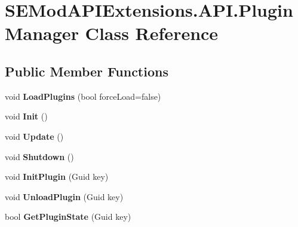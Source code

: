 \hypertarget{class_s_e_mod_a_p_i_extensions_1_1_a_p_i_1_1_plugin_manager}{}\section{S\+E\+Mod\+A\+P\+I\+Extensions.\+A\+P\+I.\+Plugin\+Manager Class Reference}
\label{class_s_e_mod_a_p_i_extensions_1_1_a_p_i_1_1_plugin_manager}
\subsection*{Public Member Functions}
\begin{DoxyCompactItemize}
\item 
\hypertarget{class_s_e_mod_a_p_i_extensions_1_1_a_p_i_1_1_plugin_manager_a08e32b15a8d576be163020fbdeb37732}{}void {\bfseries Load\+Plugins} (bool force\+Load=false)\label{class_s_e_mod_a_p_i_extensions_1_1_a_p_i_1_1_plugin_manager_a08e32b15a8d576be163020fbdeb37732}

\item 
\hypertarget{class_s_e_mod_a_p_i_extensions_1_1_a_p_i_1_1_plugin_manager_a75f9dcbc7bd3e4a63052a3882d31e00d}{}void {\bfseries Init} ()\label{class_s_e_mod_a_p_i_extensions_1_1_a_p_i_1_1_plugin_manager_a75f9dcbc7bd3e4a63052a3882d31e00d}

\item 
\hypertarget{class_s_e_mod_a_p_i_extensions_1_1_a_p_i_1_1_plugin_manager_a92a89aaa8ac849539e6e135fcb33fef7}{}void {\bfseries Update} ()\label{class_s_e_mod_a_p_i_extensions_1_1_a_p_i_1_1_plugin_manager_a92a89aaa8ac849539e6e135fcb33fef7}

\item 
\hypertarget{class_s_e_mod_a_p_i_extensions_1_1_a_p_i_1_1_plugin_manager_a8c2b614f4e66d3850b93e686ae8b303a}{}void {\bfseries Shutdown} ()\label{class_s_e_mod_a_p_i_extensions_1_1_a_p_i_1_1_plugin_manager_a8c2b614f4e66d3850b93e686ae8b303a}

\item 
\hypertarget{class_s_e_mod_a_p_i_extensions_1_1_a_p_i_1_1_plugin_manager_a6df85232226c6537ce0cfadf03ca5312}{}void {\bfseries Init\+Plugin} (Guid key)\label{class_s_e_mod_a_p_i_extensions_1_1_a_p_i_1_1_plugin_manager_a6df85232226c6537ce0cfadf03ca5312}

\item 
\hypertarget{class_s_e_mod_a_p_i_extensions_1_1_a_p_i_1_1_plugin_manager_abf94502c6d02b6e94f5bbfd0de2d24cb}{}void {\bfseries Unload\+Plugin} (Guid key)\label{class_s_e_mod_a_p_i_extensions_1_1_a_p_i_1_1_plugin_manager_abf94502c6d02b6e94f5bbfd0de2d24cb}

\item 
\hypertarget{class_s_e_mod_a_p_i_extensions_1_1_a_p_i_1_1_plugin_manager_aff7cf01854e347555a91ea895cc2e10b}{}bool {\bfseries Get\+Plugin\+State} (Guid key)\label{class_s_e_mod_a_p_i_extensions_1_1_a_p_i_1_1_plugin_manager_aff7cf01854e347555a91ea895cc2e10b}

\end{DoxyCompactItemize}
